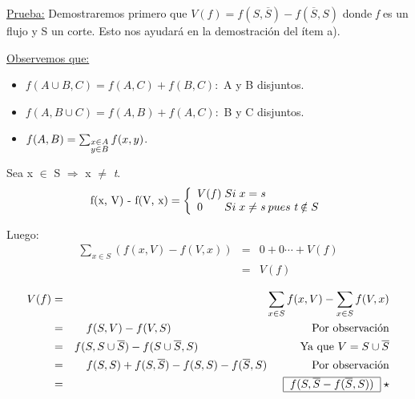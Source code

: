 \documentclass[12pt,a4paper]{report}
\newcounter{neq}
\begin{document}
		\underline{Prueba:} Demostraremos primero que $V(\textit{f}) = f(S, \overline{S}) - f(\overline{S},S)$ donde \textit{f} es un flujo y S un corte. Esto nos ayudará en la demostración del ítem a).
		
		\underline{Observemos que:}
		\begin{itemize}
			\item $f(A \cup B, C) = f(A,C) + f(B,C):$ A y B disjuntos.
			\item $f(A, B \cup C) = f(A,B) + f(A,C):$ B y C disjuntos.
			\item $f(A, B) = \sum_{\begin{subarray}{l} x \in A\\
y \in B\end{subarray}} f(x, y)$.
		\end{itemize}

		Sea x $\in$ S $\Rightarrow$ x $\neq$ \textit{t}.
		\begin{equation*}
			\textup{f(x, V) - f(V, x)} =
  			\left\lbrace
  			\begin{array}{l}
    		 V(f) \; Si \; x= \textit{s} \\
     		 0 \; \; \; \; \; \; \;  Si \; x \neq \textit{s} \; pues \; \textit{t} \notin S \\
  			\end{array}
 			 \right.
		\end{equation*}
		
		Luego:
		\begin{eqnarray}
			\nonumber \sum_{x \in S}(f(x, V) - f(V, x)) & = & 0 + 0 \dotsb + V(f) \\
			\nonumber & = & V(f)
		\end{eqnarray}
		
			\begin{eqnarray}
			\nonumber V(f) & = & \sum_{x \in S}f(x, V) - \sum_{x \in S}f(V, x) \\
			\nonumber & = & f(S, V) - f(V, S) \;\;\qquad\qquad\qquad\qquad\qquad\qquad\text{Por observación} \\
			\nonumber & = & f(S, S \cup \overline{S}) - f(S \cup \overline{S}, S) \;\;\;\;\qquad\qquad\qquad\qquad\text{Ya que } V = S \cup \overline{S} \\
           \nonumber & = & f(S, S) + f(S, \overline{S}) - f(S, S) -  f(\overline{S}, S) \qquad\qquad\text{Por observación} \\
           \nonumber & = & \begin{tabular}{|c|} \hline $f(S, \overline{S} - f(\overline{S}, S))$ \\ \hline \end{tabular} \; \star
		\end{eqnarray}
\end{document}
